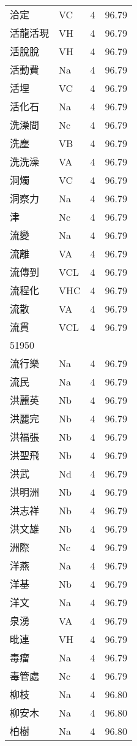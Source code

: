 \documentclass[twocolumn]{book}
\begin{document}
\begin{supertabular}{llrr}
洽定 & VC & 4 &  96.79\\
活龍活現 & VH & 4 &  96.79\\
活脫脫 & VH & 4 &  96.79\\
活動費 & Na & 4 &  96.79\\
活埋 & VC & 4 &  96.79\\
活化石 & Na & 4 &  96.79\\
洗澡間 & Nc & 4 &  96.79\\
洗塵 & VB & 4 &  96.79\\
洗洗澡 & VA & 4 &  96.79\\
洞燭 & VC & 4 &  96.79\\
洞察力 & Na & 4 &  96.79\\
津 & Nc & 4 &  96.79\\
流變 & Na & 4 &  96.79\\
流離 & VA & 4 &  96.79\\
流傳到 & VCL & 4 &  96.79\\
流程化 & VHC & 4 &  96.79\\
流散 & VA & 4 &  96.79\\
流貫 & VCL & 4 &  96.79\\
51950\\
流行樂 & Na & 4 &  96.79\\
流民 & Na & 4 &  96.79\\
洪麗英 & Nb & 4 &  96.79\\
洪麗完 & Nb & 4 &  96.79\\
洪福張 & Nb & 4 &  96.79\\
洪聖飛 & Nb & 4 &  96.79\\
洪武 & Nd & 4 &  96.79\\
洪明洲 & Nb & 4 &  96.79\\
洪志祥 & Nb & 4 &  96.79\\
洪文雄 & Nb & 4 &  96.79\\
洲際 & Nc & 4 &  96.79\\
洋燕 & Na & 4 &  96.79\\
洋基 & Nb & 4 &  96.79\\
洋文 & Na & 4 &  96.79\\
泉湧 & VA & 4 &  96.79\\
毗連 & VH & 4 &  96.79\\
毒瘤 & Na & 4 &  96.79\\
毒管處 & Nc & 4 &  96.79\\
柳枝 & Na & 4 &  96.80\\
柳安木 & Na & 4 &  96.80\\
柏樹 & Na & 4 &  96.80\\

\end{supertabular}
\end{document}
